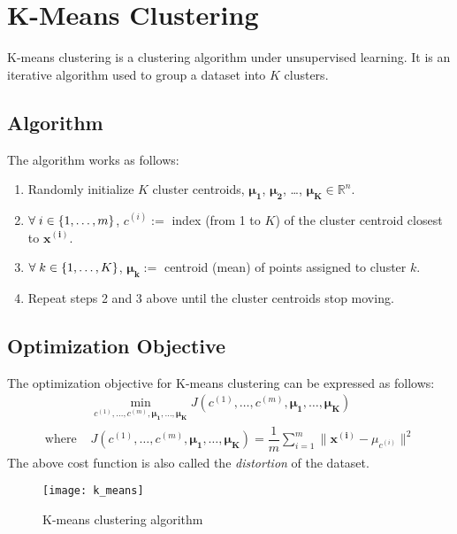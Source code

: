 \documentclass[a4paper, 12pt]{report}
\begin{document}
\newpage

\chapter{K-Means Clustering}
K-means clustering is a clustering algorithm under unsupervised learning. It is an iterative algorithm used to group a dataset into $K$ clusters.

\section{Algorithm}
The algorithm works as follows:
\begin{enumerate}
\item Randomly initialize $K$ cluster centroids, $\bm{\mu_1}$, $\bm{\mu_2}$, \dots, $\bm{\mu_K} \in \mathbb{R}^n$.
\item $\forall \hspace{1mm} i \in \{1, \dots, m\}$, $c^{\left(i\right)} := $ index (from 1 to $K$) of the cluster centroid closest to $\bm{x^{\left(i\right)}}$.
\item $\forall \hspace{1mm} k \in \{1, \dots, K\}$, $\bm{\mu_k} := $ centroid (mean) of points assigned to cluster $k$.
\item Repeat steps 2 and 3 above until the cluster centroids stop moving.
\end{enumerate}

\section{Optimization Objective}
The optimization objective for K-means clustering can be expressed as follows:
\begin{align*}
&\min_{c^{\left(1\right)}, \dots, c^{\left(m\right)}, \bm{\mu_1}, \dots, \bm{\mu_K}} J\left(c^{\left(1\right)}, \dots, c^{\left(m\right)}, \bm{\mu_1}, \dots, \bm{\mu_K}\right) \\
\text{where } & J\left(c^{\left(1\right)}, \dots, c^{\left(m\right)}, \bm{\mu_1}, \dots, \bm{\mu_K}\right) = \dfrac{1}{m}\sum_{i=1}^{m}\lVert \bm{x^{\left(i\right)}} - \mu_{c^{\left(i\right)}} \rVert^2
\end{align*}
The above cost function is also called the \textit{distortion} of the dataset.
\begin{figure}[H]
\centering
\texttt{[image: k\_means]}
\caption{K-means clustering algorithm}
\end{figure}
\end{document}
